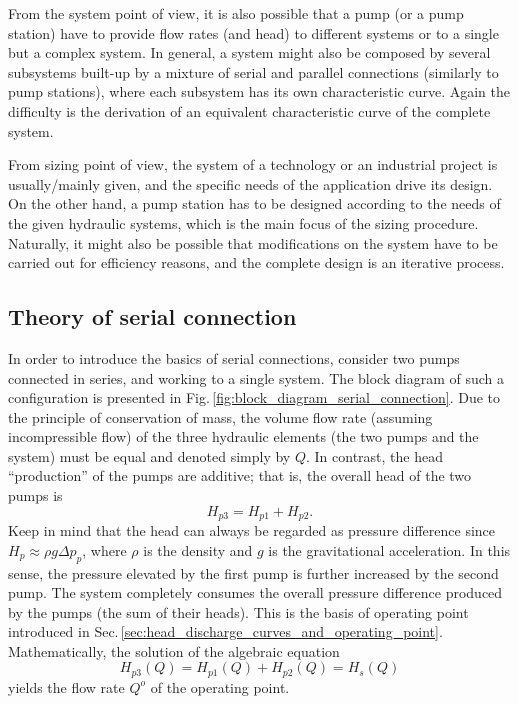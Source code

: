 From the system point of view, it is also possible that a pump (or a pump station) have to provide flow rates (and head) to different systems or to a single but a complex system. In general, a system might also be composed by several subsystems built-up by a mixture of serial and parallel connections (similarly to pump stations), where each subsystem has its own characteristic curve. Again the difficulty is the derivation of an equivalent characteristic curve of the complete system.

From sizing point of view, the system of a technology or an industrial project is usually/mainly given, and the specific needs of the application drive its design. On the other hand, a pump station has to be designed according to the needs of the given hydraulic systems, which is the main focus of the sizing procedure. Naturally, it might also be possible that modifications on the system have to be carried out for efficiency reasons, and the complete design is an iterative process.

\subsection{Theory of serial connection} \label{sec:theory_serial_connection}
In order to introduce the basics of serial connections, consider two pumps connected in series, and working to a single system. The block diagram of such a configuration is presented in Fig.\,\ref{fig:block_diagram_serial_connection}. Due to the principle of conservation of mass, the volume flow rate (assuming incompressible flow) of the three hydraulic elements (the two pumps and the system) must be equal and denoted simply by $Q$. In contrast, the head ``production'' of the pumps are additive; that is, the overall head of the two pumps is
%
\begin{equation}
H_{p3} = H_{p1} + H_{p2}.
\end{equation}
%
Keep in mind that the head can always be regarded as pressure difference since $H_p \approx \rho g \Delta p_p$, where $\rho$ is the density and $g$ is the gravitational acceleration. In this sense, the pressure elevated by the first pump is further increased by the second pump. The system completely consumes the overall pressure difference produced by the pumps (the sum of their heads). This is the basis of operating point introduced in Sec.\,\ref{sec:head_discharge_curves_and_operating_point}. Mathematically, the solution of the algebraic equation
%
\begin{equation} \label{principle_of_serial_connection}
H_{p3}(Q) = H_{p1}(Q) + H_{p2}(Q) = H_s(Q)
\end{equation}
%
yields the flow rate $Q^o$ of the operating point.

